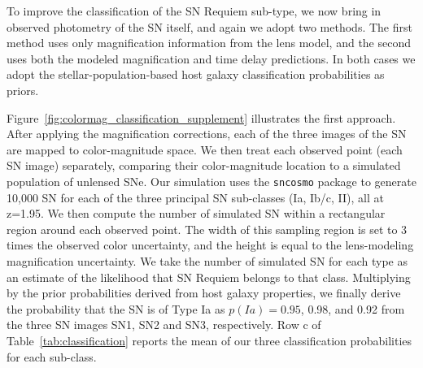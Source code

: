 \documentclass[12pt,dvipsnames]{article}
\def\SNABC{SN Requiem\xspace}
\begin{document}
To improve the classification of the \SNABC sub-type, we now bring in observed photometry of the SN itself, and again we adopt two methods.  The first method uses only magnification information from the lens model, and the second uses both the modeled magnification and time delay predictions.  In both cases we adopt the stellar-population-based host galaxy classification probabilities as priors.

Figure~\ref{fig:colormag_classification_supplement} illustrates the first approach.  After applying the magnification corrections, each of the three images of the SN are mapped to color-magnitude space.  We then treat each observed point (each SN image) separately, comparing their color-magnitude location to a simulated population of unlensed SNe.  Our simulation uses the {\tt sncosmo} package \cite{barbary_sncosmo_2016}  to generate 10,000 SN for each of the three principal SN sub-classes (Ia, Ib/c, II), all at z=1.95.  
We then compute the number of simulated SN within a rectangular region around each observed point. The width of this sampling region is set to 3 times the observed color uncertainty, and the height is equal to the lens-modeling magnification uncertainty.  We take the number of simulated SN for each type as an estimate of the likelihood that \SNABC belongs to that class. Multiplying by the prior probabilities derived from host galaxy properties, we finally derive the probability that the SN is of Type Ia as $p(Ia)=0.95$, 0.98, and 0.92 from the three SN images SN1, SN2 and SN3, respectively. Row c of Table~\ref{tab:classification} reports the mean of our three classification probabilities for each sub-class. 
\end{document}
